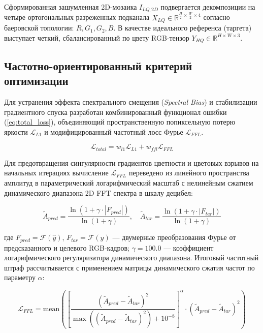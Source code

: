 \documentclass[12pt,a4paper,oneside]{article}
\begin{document}
Сформированная зашумленная 2D-мозаика $I_{LQ\_2D}$ подвергается декомпозиции на четыре ортогональных разреженных подканала $X_{LQ} \in \mathbb{R}^{\frac{H}{2} \times \frac{W}{2} \times 4}$ согласно баеровской топологии: $R, G_1, G_2, B$. В качестве идеального референса (таргета) выступает четкий, сбалансированный по цвету RGB-тензор $Y_{HQ} \in \mathbb{R}^{H \times W \times 3}$.

\subsection{Частотно-ориентированный критерий оптимизации}

Для устранения эффекта спектрального смещения (\textit{Spectral Bias}) и стабилизации градиентного спуска разработан комбинированный функционал ошибки (\ref{eq:total_loss}), объединяющий пространственную попиксельную потерю яркости $\mathcal{L}_{L1}$ и модифицированный частотный лосс Фурье $\mathcal{L}_{FFL}$.

\begin{equation}\label{eq:total_loss}
\mathcal{L}_{total} = w_{l1}\mathcal{L}_{L1} + w_{ffl}\mathcal{L}_{FFL}
\end{equation}

Для предотвращения сингулярности градиентов цветности и цветовых взрывов на начальных итерациях вычисление $\mathcal{L}_{FFL}$ переведено из линейного пространства амплитуд в параметрический логарифмический масштаб с нелинейным сжатием динамического диапазона 2D FFT спектра в шкалу децибел:

\begin{equation}\label{eq:log_amp}
\tilde{A}_{pred} = \frac{\ln(1 + \gamma \cdot |F_{pred}|)}{\ln(1 + \gamma)}, \quad \tilde{A}_{tar} = \frac{\ln(1 + \gamma \cdot |F_{tar}|)}{\ln(1 + \gamma)}
\end{equation}

где $F_{pred} = \mathcal{F}(\hat{y})$, $F_{tar} = \mathcal{F}(y)$ — двумерные преобразования Фурье от предсказанного и целевого RGB-кадров; $\gamma = 100.0$ — коэффициент логарифмического регуляризатора динамического диапазона. Итоговый частотный штраф рассчитывается с применением матрицы динамического сжатия частот по параметру $\alpha$:

\begin{equation}
\mathcal{L}_{FFL} = \text{mean}\left( \left[ \frac{(\tilde{A}_{pred} - \tilde{A}_{tar})^2}{\max((\tilde{A}_{pred} - \tilde{A}_{tar})^2) + 10^{-8}} \right]^{\alpha} \cdot (\tilde{A}_{pred} - \tilde{A}_{tar})^2 \right)
\end{equation}
\end{document}
